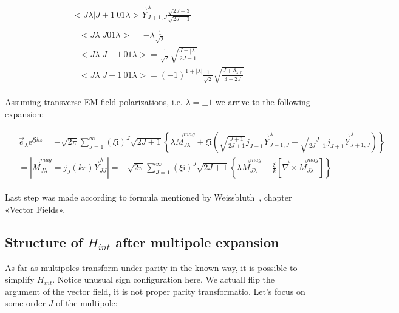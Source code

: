 \begin{align}
\begin{split}
            <J \lambda|J+1~0 1 \lambda> \vec{Y}^\lambda_{J+1,J}
            \frac{\sqrt{2J+3}}{\sqrt{2J+1}}
    \end{split}\\
    \begin{split}
        &<J \lambda|J 0 1 \lambda> = -\lambda \frac{1}{\sqrt{2}} \\
        &<J \lambda|J-1~0 1 \lambda> = \frac{1}{\sqrt{2}}
            \sqrt{\frac{J + |\lambda|}{2J-1}} \\
        &<J \lambda | J+1~0 1 \lambda>  = (-1)^{1 + |\lambda|}
            \frac{1}{\sqrt{2}} \sqrt{\frac{J + \delta_{\lambda, 0}}{3 + 2J}}
    \end{split}
\end{align}

Assuming transverse EM field polarizations, i.e.  $\lambda = \pm 1$
we arrive to the following expansion:

\begin{align}
    \begin{split}
        &\vec{e}_{\lambda} \mathrm{e}^{\xi \mathrm{i} k z} =
            -\sqrt{2 \pi} \sum_{J=1}^{\infty} (\xi \mathrm{i})^J \sqrt{2J +1}
            \left\{ \lambda \vec{M}^{mag}_{J\lambda} + \xi \mathrm{i}
            \left( \sqrt{\frac{J+1}{2J+1}} j_{J-1} \vec{Y}^\lambda_{J-1, J}
            -\sqrt{\frac{J}{2J+1}} j_{J+1} \vec{Y}^\lambda_{J+1, J} \right)
            \right\} =\\
        &=\left| \vec{M}^{mag}_{J \lambda} = j_{J}(kr)
            \vec{Y}^\lambda_{J J} \right| = -\sqrt{2 \pi} \sum_{J=1}^{\infty}
            (\xi \mathrm{i})^J \sqrt{2J +1} \left\{ \lambda \vec{M}^{mag}_{J \lambda}
            +\frac{\xi}{k} \left[ \vec{\nabla} \times
            \vec{M}^{mag}_{J \lambda} \right] \right\}
    \end{split}
\end{align}

Last step was made according to formula mentioned by Weissbluth~\cite{weissbluth}, chapter «Vector Fields».

\subsection{Structure of $H_{int}$ after multipole expansion}

As far as multipoles transform under parity in the known way, it is possible to simplify $H_{int}$. Notice unusual sign configuration here. We actuall flip the argument of the vector field, it is not proper parity transformatio. Let's focus on some order $J$ of the multipole:

